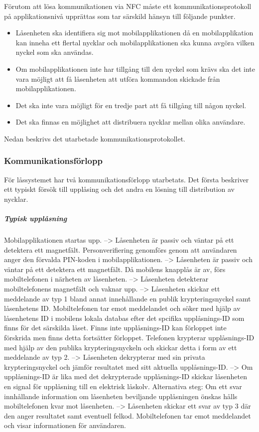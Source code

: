 \documentclass[11pt]{article}
\begin{document}
Förutom att lösa kommunikationen via NFC måste ett kommunikationsprotokoll på applikationsnivå upprättas som tar särskild hänsyn till följande punkter.

\begin{itemize}
\item Låsenheten ska identifiera sig mot mobilapplikationen då en mobilapplikation kan inneha ett flertal nycklar och mobilapplikationen ska kunna avgöra vilken nyckel som ska användas.
\item Om mobilapplikationen inte har tillgång till den nyckel som krävs ska det inte vara möjligt att få låsenheten att utföra kommandon skickade från mobilapplikationen.
\item Det ska inte vara möjligt för en tredje part att få tillgång till någon nyckel.
\item Det ska finnas en möjlighet att distribuera nycklar mellan olika användare.
\end{itemize}

Nedan beskrivs det utarbetade kommunikationsprotokollet.

\subsubsection{Kommunikationsförlopp}
För låssystemet har två kommunikationsförlopp utarbetats. Det första beskriver ett typiskt försök till upplåsing och det andra en lösning till distribution av nycklar.

\subparagraph{Typisk upplåsning}

Mobilapplikationen startas upp. --> Låsenheten är passiv och väntar på ett detektera ett magnetfält. 
Personverifiering genomförs genom att användaren anger den förvalda PIN-koden i mobilapplikationen. --> Låsenheten är passiv och väntar på ett detektera ett magnetfält. 
Då mobilens knapplås är av, förs mobiltelefonen i närheten av låsenheten. --> Låsenheten detekterar mobiltelefonens magnetfält och vaknar upp.
 --> Låsenheten skickar ett meddelande av typ 1 bland annat innehållande en publik krypteringsnyckel samt låsenhetens ID.
Mobiltelefonen tar emot meddelandet och söker med hjälp av låsenhetens ID i mobilens lokala databas efter det spcifika upplåsnings-ID som finns för det särskilda låset.
Finns inte upplåsnings-ID kan förloppet inte förskrida men finns detta fortsätter förloppet.
Telefonen krypterar upplåsnings-ID med hjälp av den publika krypteringsnyckeln och skickar detta i form av ett meddelande av typ 2.
 --> Låsenheten dekrypterar med sin privata krypteringsnyckel och jämför resultatet med sitt aktuella upplåsnings-ID.
 --> Om upplåsnings-ID är lika med det dekrypterade upplåsnings-ID skickar låsenheten en signal för upplåsning till en elektrisk låskolv.
Alternativa steg:
Om ett svar innhållande information om låsenheten beviljande upplåsningen önskas hålls mobiltelefonen kvar mot låsenheten.
 --> Låsenheten skickar ett svar av typ 3 där den anger resultatet samt eventuell felkod.
Mobiltelefonen tar emot meddelandet och visar informationen för användaren.
\end{document}
